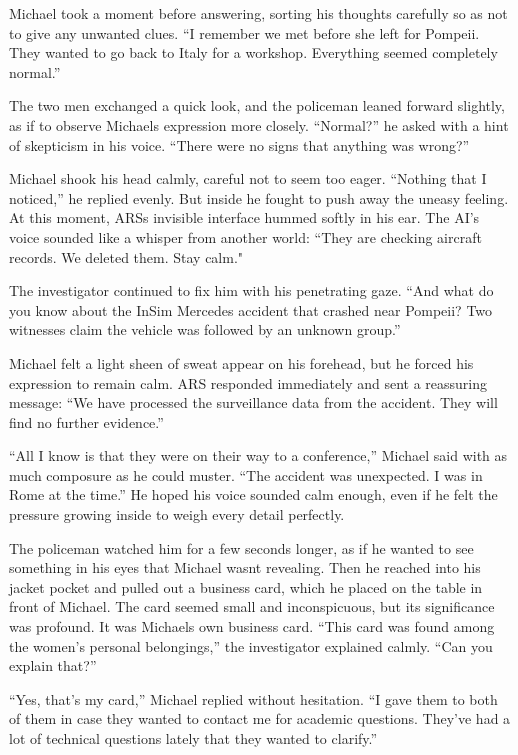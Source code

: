 \documentclass[
]{article}
\begin{document}
Michael took a moment before answering, sorting his thoughts carefully
so as not to give any unwanted clues. ``I remember we met before she
left for Pompeii. They wanted to go back to Italy for a workshop.
Everything seemed completely normal.''

The two men exchanged a quick look, and the policeman leaned forward
slightly, as if to observe Michael\textquotesingle s expression more
closely. ``Normal?'' he asked with a hint of skepticism in his voice.
``There were no signs that anything was wrong?''

Michael shook his head calmly, careful not to seem too eager. ``Nothing
that I noticed,'' he replied evenly. But inside he fought to push away
the uneasy feeling. At this moment, ARS\textquotesingle s invisible
interface hummed softly in his ear. The AI's voice sounded like a
whisper from another world: ``They are checking aircraft records. We
deleted them. Stay calm."

The investigator continued to fix him with his penetrating gaze. ``And
what do you know about the InSim Mercedes accident that crashed near
Pompeii? Two witnesses claim the vehicle was followed by an unknown
group.''

Michael felt a light sheen of sweat appear on his forehead, but he
forced his expression to remain calm. ARS responded immediately and sent
a reassuring message: ``We have processed the surveillance data from the
accident. They will find no further evidence.''

``All I know is that they were on their way to a conference,'' Michael
said with as much composure as he could muster. ``The accident was
unexpected. I was in Rome at the time.'' He hoped his voice sounded calm
enough, even if he felt the pressure growing inside to weigh every
detail perfectly.

The policeman watched him for a few seconds longer, as if he wanted to
see something in his eyes that Michael wasn\textquotesingle t revealing.
Then he reached into his jacket pocket and pulled out a business card,
which he placed on the table in front of Michael. The card seemed small
and inconspicuous, but its significance was profound. It was
Michael\textquotesingle s own business card. ``This card was found among
the women's personal belongings,'' the investigator explained calmly.
``Can you explain that?''

``Yes, that's my card,'' Michael replied without hesitation. ``I gave
them to both of them in case they wanted to contact me for academic
questions. They've had a lot of technical questions lately that they
wanted to clarify.''
\end{document}
